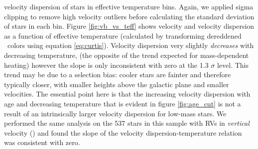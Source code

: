 velocity dispersion of stars in effective temperature bins.
Again, we applied sigma clipping to remove high velocity outliers before
calculating the standard deviation of stars in each bin.
Figure \ref{fig:vb_vs_teff} shows velocity and velocity dispersion
as a function of effective temperature (calculated by transforming dereddened
\gaia\ colors using equation \ref{eq:curtis}).
Velocity dispersion very slightly {\it decreases} with decreasing temperature,
(the opposite of the trend expected for mass-dependent heating) however the
slope is only inconsistent with zero at the 1.3 $\sigma$ level.
This trend may be due to a selection bias: cooler stars are fainter and
therefore typically closer, with smaller heights above the galactic plane and
smaller velocities.
The essential point here is that the increasing velocity dispersion with age
and decreasing temperature that is evident in figure \ref{fig:age_cut} is not
a result of an intrinsically larger velocity dispersion for low-mass stars.
We performed the same analysis on the 537 stars in this sample with RVs in
{\it vertical} velocity (\vz) and found the slope of the velocity
dispersion-temperature relation was consistent with zero.

